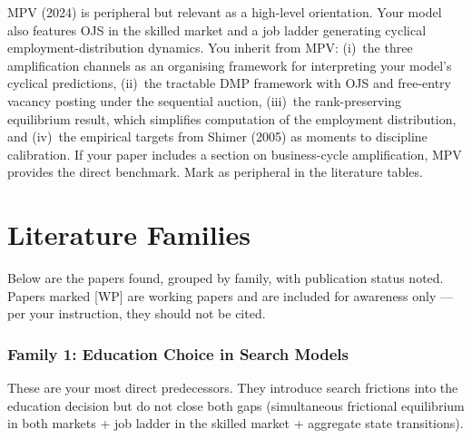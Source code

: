 \documentclass[12pt]{article}
\begin{document}
MPV (2024) is peripheral but relevant as a high-level orientation. Your model also features OJS in the skilled market and a job ladder generating cyclical employment-distribution dynamics. You inherit from MPV: (i)~the three amplification channels as an organising framework for interpreting your model's cyclical predictions, (ii)~the tractable DMP framework with OJS and free-entry vacancy posting under the sequential auction, (iii)~the rank-preserving equilibrium result, which simplifies computation of the employment distribution, and (iv)~the empirical targets from Shimer (2005) as moments to discipline calibration. If your paper includes a section on business-cycle amplification, MPV provides the direct benchmark. Mark as peripheral in the literature tables.


\newpage
\part{Literature Families}

Below are the papers found, grouped by family, with publication status noted. Papers marked [WP] are working papers and are included for awareness only --- per your instruction, they should not be cited.

\section{Family 1: Education Choice in Search Models}

These are your most direct predecessors. They introduce search frictions into the education decision but do not close both gaps (simultaneous frictional equilibrium in both markets + job ladder in the skilled market + aggregate state transitions).
\end{document}
